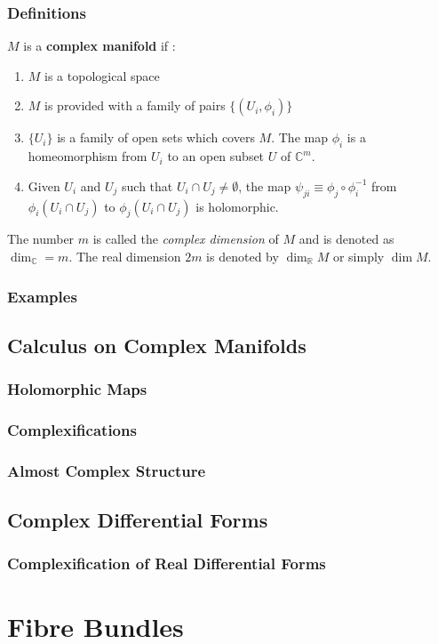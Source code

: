 \documentclass[10pt]{article}
\begin{document}
\subsubsection{Definitions}
\begin{definition}
    $M$ is a \textbf{complex manifold} if :
    \begin{enumerate}
        \item $M$ is a topological space 
        \item $M$ is provided with a family of pairs $\{(U_i,\phi_i)\}$
        \item $\{U_i\}$ is a family of open sets which covers $M$.
              The map $\phi_i$ is a homeomorphism from $U_i$ to an open subset $U$ of $\mathbb{C}^m$.\snm
        \item Given $U_i$ and $U_j$ such that $U_i\cap U_j\neq\emptyset$, the map $\psi_{ji}\equiv\phi_j\circ\phi_i^{-1}$ from $\phi_i(U_i\cap U_j)$ to $\phi_j(U_i\cap U_j)$ is holomorphic.
    \end{enumerate}
\end{definition}
The number $m$ is called the \textit{complex dimension} of $M$ and is denoted as $\dim_{\mathbb{C}}=m$.
The real dimension $2m$ is denoted by $\dim_\mathbb{R} M$ or simply $\dim M$.

\subsubsection{Examples}
\subsection{Calculus on Complex Manifolds}
\subsubsection{Holomorphic Maps}
\subsubsection{Complexifications}
\subsubsection{Almost Complex Structure}
\subsection{Complex Differential Forms}
\subsubsection{Complexification of Real Differential Forms}

\clearpage
\section{Fibre Bundles}



\clearpage




\clearpage
\listoftheorems[ignoreall,title={List of Definitions}, onlynamed={definition}, swapnumber]
\end{document}
